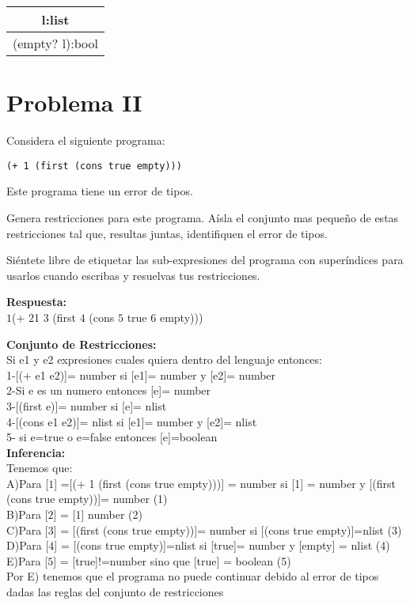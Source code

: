 \documentclass{article}
\begin{document}
\begin{center}
 \begin{longtable}{c}
 l:list \\ \hline
 (empty? l):bool \\
\end{longtable}

\end{center}

\section*{Problema II}
Considera el siguiente programa:

\begin{verbatim}
(+ 1 (first (cons true empty)))
\end{verbatim}

Este programa tiene un error de tipos.

Genera restricciones para este programa. Aísla el conjunto mas pequeño de
estas restricciones tal que, resultas juntas, identifiquen el error de tipos.

Siéntete libre de etiquetar las sub-expresiones del programa con superíndices
para usarlos cuando escribas y resuelvas tus restricciones.

\textbf {Respuesta: }
\\
$\boxed{1}$(+ $\boxed{2}$1  $\boxed{3}$ (first $\boxed{4}$ (cons $\boxed{5}$ true $\boxed{6}$ empty)))

\textbf {Conjunto de Restricciones: }
\\
Si e1 y e2 expresiones cuales quiera dentro del lenguaje entonces:
 \\
 1-[(+ e1 e2)]= number si [e1]= number y [e2]= number
 \\
 2-Si e es un numero entonces [e]= number
 \\
 3-[(first e)]= number si [e]= nlist
 \\
 4-[(cons e1 e2)]= nlist si [e1]= number y [e2]= nlist
 \\
 5- si e=true o e=false entonces [e]=boolean 
 \\
\textbf{Inferencia: }
  \\
  Tenemos que: 
  \\
  A)Para [$\boxed{1}$] =[(+ 1 (first (cons true empty)))] = number si [1] = number y [(first (cons true empty))]= number (1)\\ 
  B)Para [$\boxed{2}$] = [1] number (2)\\
  C)Para [$\boxed{3}$] = [(first (cons true empty))]= number si [(cons true empty)]=nlist (3)\\
  D)Para [$\boxed{4}$] = [(cons true empty)]=nlist si [true]= number y [empty] = nlist (4)\\
  E)Para [$\boxed{5}$] = [true]!=number sino que [true] = boolean (5)\\
  Por E) tenemos que el programa no puede continuar debido al error de tipos dadas las reglas del conjunto de restricciones
    
\end{document}

